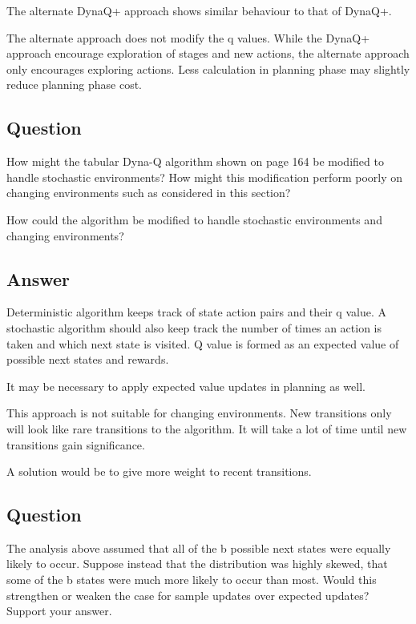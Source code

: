 \documentclass[11pt]{article}
\begin{document}
    The alternate DynaQ+ approach shows similar behaviour to that of DynaQ+.

    The alternate approach does not modify the q values.
    While the DynaQ+ approach encourage exploration of stages and new actions, the alternate approach only encourages exploring actions.
    Less calculation in planning phase may slightly reduce planning phase cost.

    \subsection{Question}

    How might the tabular Dyna-Q algorithm shown on page 164 be modified to handle stochastic environments?
    How might this modification perform poorly on changing environments such as considered in this section?

    How could the algorithm be modified to handle stochastic environments and changing environments?

    \subsection*{Answer}

    Deterministic algorithm keeps track of state action pairs and their q value.
    A stochastic algorithm should also keep track the number of times an action is taken and which next state is visited.
    Q value is formed as an expected value of possible next states and rewards.

    It may be necessary to apply expected value updates in planning as well.

    This approach is not suitable for changing environments.
    New transitions only will look like rare transitions to the algorithm.
    It will take a lot of time until new transitions gain significance.

    A solution would be to give more weight to recent transitions.


    \subsection{Question}

    The analysis above assumed that all of the b possible next states were equally likely to occur.
    Suppose instead that the distribution was highly skewed, that some of the b states were much more likely to occur than most.
    Would this strengthen or weaken the case for sample updates over expected updates?
    Support your answer.
\end{document}
